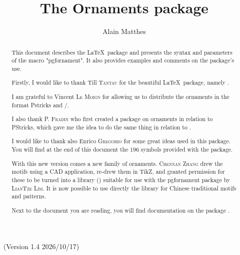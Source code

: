 \documentclass[a4paper,nofonts]{tufte-handout}
\title{The Ornaments package}
\author{Alain Matthes}
\begin{document}
\maketitle
\noindent{}
\begin{marginfigure}
\end{marginfigure}


\bigskip
\noindent{}\ (Version  1.4 2026/10/17)
\begin{abstract}

This document describes the \LaTeX\ package \emph{} and presents the syntax and parameters of the macro "pgfornament".
It also provides examples and comments on the package's use.

 Firstly, I would like to thank {Till \textsc{Tantau}} for the  beautiful \LaTeX\ package, namely \TIKZ.

I am grateful to  Vincent \textsc{Le Moign} for allowing us to distribute the ornaments  in the format Pstricks and \PGF/\TIKZ.

I also thank \textsc{P. Fradin} who first created a package on ornaments in relation to PStricks, which gave me the idea to do the same thing in relation to \TIKZ.

I would like to thank also {Enrico  \textsc{Gregorio}} for some great ideas used in this package. You will find at the end of this document the 196 symbols provided with the package.

With this new version comes a new family of ornaments.
\textsc{Chennan Zhang} drew the motifs using a CAD application, re-drew them in TikZ, and granted permission for these to be turned into a library (\emph{}) suitable for use with the pgfornament package by \textsc{LianTze Lim}.
It is now possible to use directly the library for Chinese traditional motifs and patterns.

Next to the document you are reading, you will find documentation on the package \emph{}.
\end{abstract}

\vspace{1cm}
\hfil  {}\hfil
\end{document}
